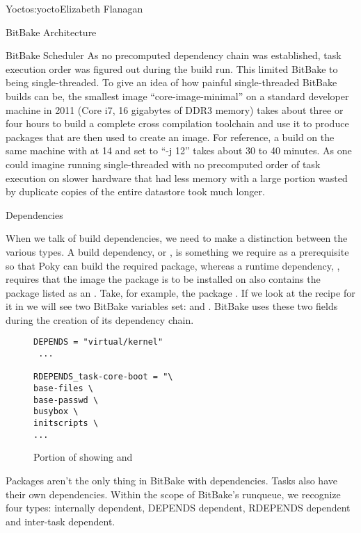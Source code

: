 \begin{aosachapter}{Yocto}{s:yocto}{Elizabeth Flanagan}
\begin{aosasect1}{BitBake Architecture}
\begin{aosasect2}{BitBake Scheduler}
As no precomputed dependency chain was established, task execution
order was figured out during the build run. This limited BitBake to
being single-threaded. To give an idea of how painful
single-threaded BitBake builds can be, the smallest image
``core-image-minimal'' on a standard developer machine in 2011
(Core\textsuperscript{\textregistered} i7, 16 gigabytes of DDR3
memory) takes about three or four hours to build a complete cross
compilation toolchain and use it to produce packages that are then
used to create an image. For reference, a build on the same machine
with  at 14 and  set to ``-j 12''
takes about 30 to 40 minutes. As one could imagine running single-threaded
with no precomputed order of task execution on slower
hardware that had less memory with a large portion wasted by duplicate
copies of the entire datastore took much longer.

\begin{aosasect3}{Dependencies}

When we talk of build dependencies, we need to make a distinction
between the various types. A build dependency, or , is
something we require as a prerequisite so that Poky can build the
required package, whereas a runtime dependency, , requires
that the image the package is to be installed on also contains the
package listed as an . Take, for example, the package
. If we look at the recipe for it in
 we will see two BitBake
variables set:  and . BitBake uses these two fields
during the creation of its dependency chain. 

\begin{figure}
\begin{verbatim}
DEPENDS = "virtual/kernel"
 ...

RDEPENDS_task-core-boot = "\
base-files \
base-passwd \
busybox \
initscripts \
...
\end{verbatim}
\caption{Portion of  showing  and }
\label{fig.yocto.depends}
\end{figure}

Packages aren't the only thing in BitBake with dependencies. Tasks
also have their own dependencies.  Within the scope of BitBake's
runqueue, we recognize four types: internally dependent, DEPENDS
dependent, RDEPENDS dependent and inter-task dependent.


\end{aosasect3}
\end{aosasect2}
\end{aosasect1}
\end{aosachapter}
